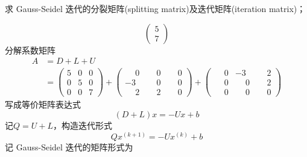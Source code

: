 \documentclass[11pt]{article}
\begin{document}
\begin{question}
\begin{subquestion}{求 Gauss-Seidel 迭代的分裂矩阵(splitting matrix)及迭代矩阵(iteration matrix)；}
{\begin{equation*}
\begin{pmatrix}
                    5 \\
                    7
                \end{pmatrix}
            \end{equation*}
            分解系数矩阵
            \begin{align*}
                A & = D + L + U \\
                  & =
                \begin{pmatrix}
                    5 & 0 & 0 \\
                    0 & 5 & 0 \\
                    0 & 0 & 7
                \end{pmatrix}
                +
                \begin{pmatrix}
                    \phantom{-}0 & \phantom{-}0 & \phantom{-}0 \\
                    -3           & \phantom{-}0 & \phantom{-}0 \\
                    \phantom{-}2 & \phantom{-}2 & \phantom{-}0
                \end{pmatrix}
                +
                \begin{pmatrix}
                    \phantom{-}0 & -3           & \phantom{-}2 \\
                    \phantom{-}0 & \phantom{-}0 & \phantom{-}2 \\
                    \phantom{-}0 & \phantom{-}0 & \phantom{-}0
                \end{pmatrix}
            \end{align*}
            写成等价矩阵表达式
            \begin{equation*}
                (D + L)x = -Ux + b
            \end{equation*}
            记$Q = U + L$，构造迭代形式
            \begin{equation*}
                Qx^{(k + 1)} = -Ux^{(k)} + b
            \end{equation*}
            记 Gauss-Seidel 迭代的矩阵形式为

}
\end{subquestion}
\end{question}
\end{document}
